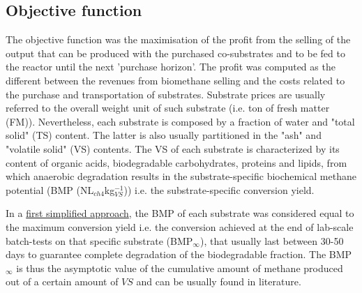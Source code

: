 \subsection{Objective function}
The objective function was the maximisation of the profit from the selling of the output that can be produced with the purchased co-substrates and to be fed to the reactor until the next 'purchase horizon'. The profit was computed as the different between the revenues from biomethane selling and the costs related to the purchase and transportation of substrates. 
Substrate prices are usually referred to the overall weight unit of such substrate (i.e. ton of fresh matter (FM)). Nevertheless, each substrate is composed by a fraction of water and "total solid" (TS) content. The latter is also usually partitioned in the "ash" and "volatile solid" (VS) contents. The VS of each substrate is characterized by its content of organic acids, biodegradable carbohydrates, proteins and lipids, from which anaerobic degradation results in the substrate-specific biochemical methane potential (BMP (NL$_{ch4}$kg$_{VS}^{-1}$)) i.e. the substrate-specific conversion yield.

In a \underline{first simplified approach}, the BMP of each substrate was considered equal to the maximum conversion yield i.e. the conversion achieved at the end of lab-scale batch-tests on that specific substrate (BMP$_\infty$), that usually last between 30-50 days to guarantee complete degradation of the biodegradable fraction. The BMP$_{\infty}$ is thus the asymptotic value of the cumulative amount of methane produced out of a certain amount of $VS$ and can be usually found in literature.

